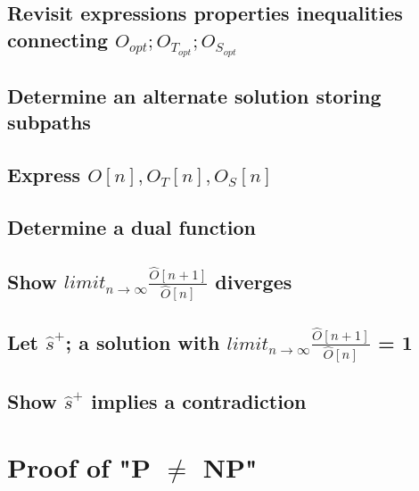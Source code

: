 \documentclass[11pt]{article}
\begin{document}
\subsection{Revisit expressions properties inequalities connecting $O_{opt}; O_{T_{opt}}; O_{S_{opt}}$}
\subsection{Determine an alternate solution storing subpaths}
\subsection{Express $O[n],O_T[n],O_S[n]$}
\subsection{Determine a dual function}
\subsection{Show $limit_{n \rightarrow \infty} \frac{\hat{O}[n+1]}{\hat{O}[n]}$ \hspace{1mm} diverges}
\subsection{Let $\hat{s}^+$; a solution with $limit_{n \rightarrow \infty} \frac{\hat{O}[n+1]}{\hat{O}[n]}$ = 1}
\subsection{Show $\hat{s}^+$ implies a contradiction}





\newpage
\section{Proof of "P $\neq$ NP"}











\newpage
\end{document}
